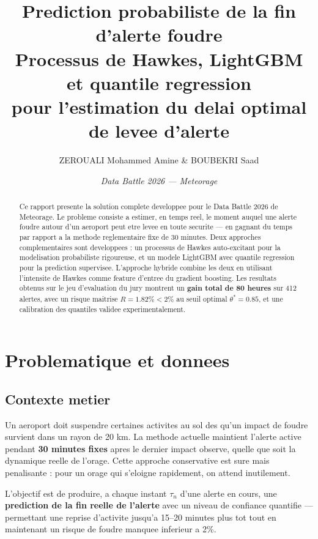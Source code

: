 \documentclass[a4paper,11pt]{article}
\title{%
  \textbf{Prediction probabiliste de la fin d'alerte foudre}\\[0.4em]
  \large Processus de Hawkes, LightGBM et quantile regression\\
  \large pour l'estimation du delai optimal de levee d'alerte
}
\author{ZEROUALI Mohammed Amine \& BOUBEKRI Saad}
\date{\textit{Data Battle 2026 --- Meteorage}}
\begin{document}
\maketitle

\begin{abstract}
Ce rapport presente la solution complete developpee pour le Data Battle 2026 de
Meteorage. Le probleme consiste a estimer, en temps reel, le moment auquel une
alerte foudre autour d'un aeroport peut etre levee en toute securite --- en
gagnant du temps par rapport a la methode reglementaire fixe de 30 minutes.
Deux approches complementaires sont developpees : un processus de Hawkes
auto-excitant pour la modelisation probabiliste rigoureuse, et un modele
LightGBM avec quantile regression pour la prediction supervisee. L'approche
hybride combine les deux en utilisant l'intensite de Hawkes comme feature
d'entree du gradient boosting. Les resultats obtenus sur le jeu d'evaluation
du jury montrent un \textbf{gain total de 80 heures} sur 412 alertes, avec un
risque maitrise $R = 1.82\% < 2\%$ au seuil optimal $\theta^* = 0.85$, et
une calibration des quantiles validee experimentalement.
\end{abstract}

\tableofcontents
\newpage

\section{Problematique et donnees}

\subsection{Contexte metier}

Un aeroport doit suspendre certaines activites au sol des qu'un impact de foudre
survient dans un rayon de 20 km. La methode actuelle maintient l'alerte active
pendant \textbf{30 minutes fixes} apres le dernier impact observe, quelle que
soit la dynamique reelle de l'orage. Cette approche conservative est sure mais
penalisante : pour un orage qui s'eloigne rapidement, on attend inutilement.

L'objectif est de produire, a chaque instant $\tau_n$ d'une alerte en cours,
une \textbf{prediction de la fin reelle de l'alerte} avec un niveau de confiance
quantifie --- permettant une reprise d'activite jusqu'a 15--20 minutes plus tot
tout en maintenant un risque de foudre manquee inferieur a 2\%.
\end{document}
